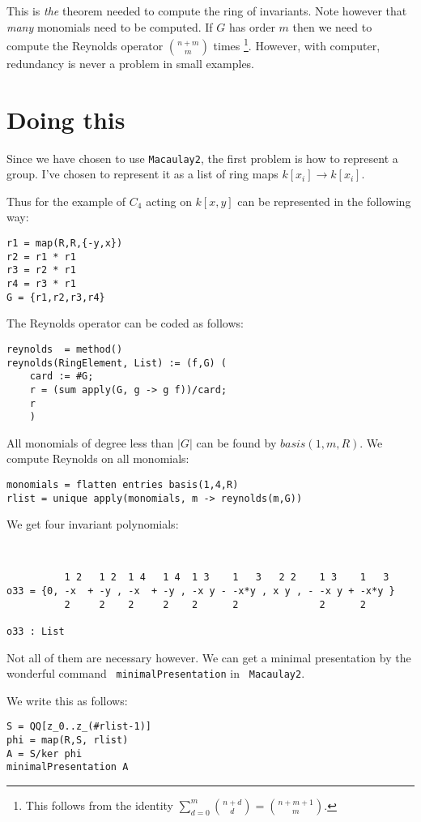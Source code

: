 \documentclass[11pt, english]{article}
\begin{document}
This is \emph{the} theorem needed to compute the ring of invariants. Note however that \emph{many} monomials need to be computed. If $G$ has order $m$ then we need to compute the Reynolds operator $\binom{n+m}{m}$ times \footnote{This follows from the identity $\sum_{d=0}^m \binom{n+d}{d} = \binom{n+m+1}{m}$.}. However, with computer, redundancy is never a problem in small examples.


\section{Doing this}

Since we have chosen to use \verb'Macaulay2', the first problem is how to represent a group. I've chosen to represent it as a list of ring maps $k[x_i] \to k[x_i]$. 

Thus for the example of $C_4$ acting on $k[x,y]$ can be represented in the following way:

\begin{lstlisting}
r1 = map(R,R,{-y,x})
r2 = r1 * r1
r3 = r2 * r1
r4 = r3 * r1 
G = {r1,r2,r3,r4}
\end{lstlisting}

The Reynolds operator can be coded as follows:
\begin{lstlisting}
reynolds  = method()
reynolds(RingElement, List) := (f,G) (
    card := #G;
    r = (sum apply(G, g -> g f))/card;
    r
    )
\end{lstlisting}

All monomials of degree less than $\lvert G \rvert$ can be found by $basis(1,m,R)$. We compute Reynolds on all monomials:
\begin{lstlisting}
monomials = flatten entries basis(1,4,R)
rlist = unique apply(monomials, m -> reynolds(m,G))
\end{lstlisting}

We get four invariant polynomials:
\begin{verbatim}


          1 2   1 2  1 4   1 4  1 3    1   3   2 2    1 3    1   3
o33 = {0, -x  + -y , -x  + -y , -x y - -x*y , x y , - -x y + -x*y }
          2     2    2     2    2      2              2      2

o33 : List
\end{verbatim}

Not all of them are necessary however. We can get a minimal presentation  by the wonderful command \verb' minimalPresentation' in \verb' Macaulay2'. 

We write this as follows:
\begin{lstlisting}
S = QQ[z_0..z_(#rlist-1)]
phi = map(R,S, rlist)
A = S/ker phi
minimalPresentation A
\end{lstlisting}
\end{document}
